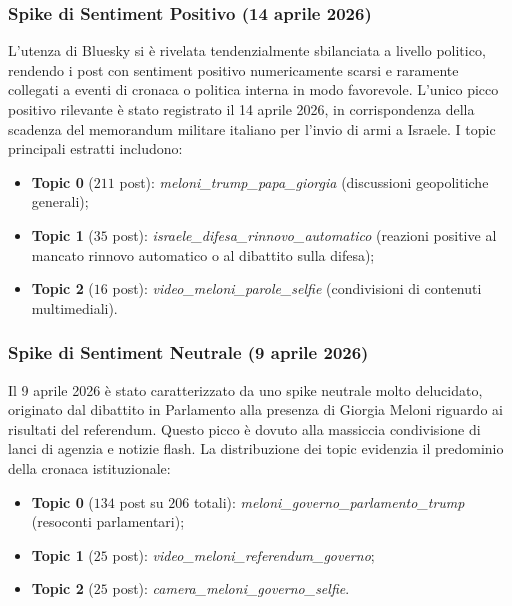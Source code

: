 \documentclass[11pt]{article}
\begin{document}
\subsubsection{Spike di Sentiment Positivo (14 aprile 2026)}
L'utenza di Bluesky si è rivelata tendenzialmente sbilanciata a livello politico, rendendo i post con sentiment positivo numericamente scarsi e raramente collegati a eventi di cronaca o politica interna in modo favorevole. L'unico picco positivo rilevante è stato registrato il 14 aprile 2026, in corrispondenza della scadenza del memorandum militare italiano per l'invio di armi a Israele. I topic principali estratti includono:
\begin{itemize}
    \item \textbf{Topic 0} ($211$ post): \textit{meloni\_trump\_papa\_giorgia} (discussioni geopolitiche generali);
    \item \textbf{Topic 1} ($35$ post): \textit{israele\_difesa\_rinnovo\_automatico} (reazioni positive al mancato rinnovo automatico o al dibattito sulla difesa);
    \item \textbf{Topic 2} ($16$ post): \textit{video\_meloni\_parole\_selfie} (condivisioni di contenuti multimediali).
\end{itemize}

\subsubsection{Spike di Sentiment Neutrale (9 aprile 2026)}
Il 9 aprile 2026 è stato caratterizzato da uno spike neutrale molto delucidato, originato dal dibattito in Parlamento alla presenza di Giorgia Meloni riguardo ai risultati del referendum. Questo picco è dovuto alla massiccia condivisione di lanci di agenzia e notizie flash. La distribuzione dei topic evidenzia il predominio della cronaca istituzionale:
\begin{itemize}
    \item \textbf{Topic 0} ($134$ post su $206$ totali): \textit{meloni\_governo\_parlamento\_trump} (resoconti parlamentari);
    \item \textbf{Topic 1} ($25$ post): \textit{video\_meloni\_referendum\_governo};
    \item \textbf{Topic 2} ($25$ post): \textit{camera\_meloni\_governo\_selfie}.
\end{itemize}
\end{document}
